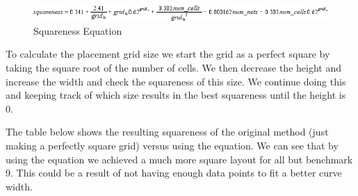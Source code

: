 \documentclass[10pt]{article}
\begin{document}
        \begin{figure}[H]
            \centering
            \includegraphics[width=\linewidth]{./square_eq.png}
            \caption{Squareness Equation}
        \end{figure}

        To calculate the placement grid size we start the grid as a perfect
        square by taking the square root of the number of cells. We then
        decrease the height and increase the width and check the squareness of
        this size. We continue doing this and keeping track of which size
        results in the best squareness until the height is 0.

        The table below shows the resulting squareness of the original method
        (just making a perfectly square grid) versus using the equation. We
        can see that by using the equation we achieved a much more square
        layout for all but benchmark 9. This could be a result of not having
        enough data points to fit a better curve width.
\end{document}
